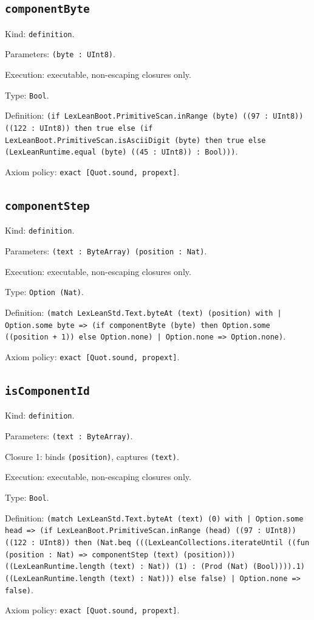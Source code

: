 \documentclass[11pt]{article}
\begin{document}
\subsection*{\texttt{componentByte}}
\noindent Kind: \texttt{definition}.\par
\noindent Parameters: \texttt{(byte : UInt8)}.\par
\noindent Execution: executable, non-escaping closures only.\par
\noindent Type: \texttt{Bool}.\par
\noindent Definition: \texttt{(if LexLeanBoot.PrimitiveScan.inRange (byte) ((97 : UInt8)) ((122 : UInt8)) then true else (if LexLeanBoot.PrimitiveScan.isAsciiDigit (byte) then true else (LexLeanRuntime.equal (byte) ((45 : UInt8)) : Bool)))}.\par
\noindent Axiom policy: \texttt{exact [Quot.sound, propext]}.\par
\subsection*{\texttt{componentStep}}
\noindent Kind: \texttt{definition}.\par
\noindent Parameters: \texttt{(text : ByteArray) (position : Nat)}.\par
\noindent Execution: executable, non-escaping closures only.\par
\noindent Type: \texttt{Option (Nat)}.\par
\noindent Definition: \texttt{(match LexLeanStd.Text.byteAt (text) (position) with | Option.some byte => (if componentByte (byte) then Option.some ((position + 1)) else Option.none) | Option.none => Option.none)}.\par
\noindent Axiom policy: \texttt{exact [Quot.sound, propext]}.\par
\subsection*{\texttt{isComponentId}}
\noindent Kind: \texttt{definition}.\par
\noindent Parameters: \texttt{(text : ByteArray)}.\par
\noindent Closure 1: binds \texttt{(position)}, captures \texttt{(text)}.\par
\noindent Execution: executable, non-escaping closures only.\par
\noindent Type: \texttt{Bool}.\par
\noindent Definition: \texttt{(match LexLeanStd.Text.byteAt (text) (0) with | Option.some head => (if LexLeanBoot.PrimitiveScan.inRange (head) ((97 : UInt8)) ((122 : UInt8)) then (Nat.beq (((LexLeanCollections.iterateUntil ((fun (position : Nat) => componentStep (text) (position))) ((LexLeanRuntime.length (text) : Nat)) (1) : (Prod (Nat) (Bool)))).1) ((LexLeanRuntime.length (text) : Nat))) else false) | Option.none => false)}.\par
\noindent Axiom policy: \texttt{exact [Quot.sound, propext]}.\par
\end{document}
